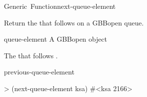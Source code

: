 \documentclass[10pt,twoside,english,pdftex]{article}
\begin{document}
\begin{functiondoc}{Generic~Function}{next-queue-element}{
   \returns{} }
%

\fnsyntax

\fnpurpose Return the  that follows 
on a GBBopen queue.

\fnmethods
{}%
  {\code{(} 
  \returns{} }

\fnpackage {}

\fnmodule {}

\fnargs
\begin{args}{queue-element}
 A GBBopen  object
\end{args}

\fnreturns The  that follows
. 
  
\begin{alsos}{previous-queue-element}
\end{alsos}

\fnexample
\begin{example}
> (next-queue-element ksa)
#<ksa 2166>
\end{example}

\end{functiondoc}

\end{document}
